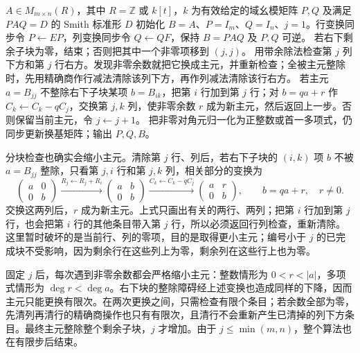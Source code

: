 \begin{algorithm}[htbp]
	\caption{Smith 约化}
	\label{b2:alg:A-smith}
	\begin{algorithmsteps}{\(A\in M_{m\times n}(R)\)，其中 \(R=\mathbb Z\) 或 \(k[t]\)，\(k\) 为有效给定的域}{幺模矩阵 \(P,Q\) 及满足 \(PAQ=D\) 的 Smith 标准形 \(D\)}
		\State 初始化 \(B=A\)、\(P=I_m\)、\(Q=I_n\)、\(j=1\)。行变换同步令 \(P\leftarrow EP\)，列变换同步令 \(Q\leftarrow QF\)，保持 \(B=PAQ\) 及 \(P,Q\) 可逆。
			\State 若右下剩余子块为零，结束；否则把其中一个非零项移到 \((j,j)\)。
			\State 用带余除法检查第 \(j\) 列下方和第 \(j\) 行右方。发现非零余数就把它换成主元，并重新检查；全被主元整除时，先用精确商作行减法清除该列下方，再作列减法清除该行右方。
			\State 若主元 \(a=B_{jj}\) 不整除右下子块某项 \(b=B_{ik}\)，把第 \(i\) 行加到第 \(j\) 行；对 \(b=qa+r\) 作 \(C_k\leftarrow C_k-qC_j\)，交换第 \(j,k\) 列，使非零余数 \(r\) 成为新主元，然后返回上一步。否则保留当前主元，令 \(j\leftarrow j+1\)。
		\EndWhile
		\State 把非零对角元归一化为正整数或首一多项式，仍同步更新换基矩阵；输出 \(P,Q,B\)。
	\end{algorithmsteps}
\end{algorithm}

分块检查也确实会缩小主元。清除第 \(j\) 行、列后，若右下子块的 \((i,k)\) 项 \(b\) 不被 \(a=B_{jj}\) 整除，只看第 \(j,i\) 行和第 \(j,k\) 列，相关部分的变换为
\[
	\begin{pmatrix}a&0\\0&b\end{pmatrix}
	\xrightarrow{R_j\leftarrow R_j+R_i}
	\begin{pmatrix}a&b\\0&b\end{pmatrix}
	\xrightarrow{C_k\leftarrow C_k-qC_j}
	\begin{pmatrix}a&r\\0&b\end{pmatrix},
	\qquad b=qa+r,\quad r\ne0.
\]
交换这两列后，\(r\) 成为新主元。上式只画出有关的两行、两列；把第 \(i\) 行加到第 \(j\) 行，也会把第 \(i\) 行的其他条目带入第 \(j\) 行，所以必须返回行列检查，重新清除。这里暂时破坏的是当前行、列的零项，目的是取得更小主元；编号小于 \(j\) 的已完成块不受影响，因为剩余行在这些列上为零，剩余列在这些行上也为零。

\ProseParagraphBreak
固定 \(j\) 后，每次遇到非零余数都会严格缩小主元：整数情形为 \(0<r<|a|\)，多项式情形为 \(\deg r<\deg a\)。右下块的整除障碍经上述变换也造成同样的下降，因而主元只能更换有限次。在两次更换之间，只需检查有限个条目；若余数全部为零，先清列再清行的精确商操作也只有有限次，且清行不会重新产生已清掉的列下方条目。最终主元整除整个剩余子块，\(j\) 才增加。由于 \(j\le\min(m,n)\)，整个算法也在有限步后结束。

